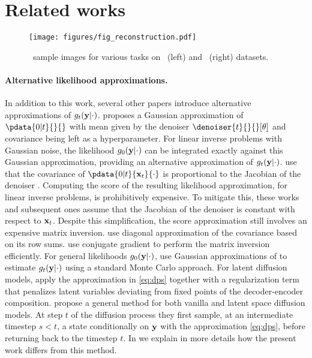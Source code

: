 \section{Related works}
\begin{figure*}[!t]
    \centering 
    \texttt{[image: figures/fig\_reconstruction.pdf]}
    \captionsetup{font=small}
    \caption{\algo\ sample images for various tasks on \imagenet\ (left) and \ffhq\ (right) datasets.}
    \label{fig:main-reconstructions}
\end{figure*}
\paragraph{Alternative likelihood approximations.} In addition to this work, several other papers introduce alternative approximations of $\pot{t}{}$. \cite{song2022pseudoinverse} proposes a Gaussian approximation of $\pdata{0|t}{}{}$ with mean given by the denoiser $\denoiser{t}{}{}[\param]$ and covariance being left as a hyperparameter. For linear inverse problems with Gaussian noise, the likelihood $\pot{0}{}$ can be integrated exactly against this Gaussian approximation, providing an alternative approximation of $\pot{t}{}$. \citet{finzi2023user, stevens2023removing, boys2023tweedie} use that the covariance of $\pdata{0|t}{\bx_t}{\cdot}$ is proportional to the Jacobian of the denoiser \cite{meng2021estimating}. Computing the score of the resulting likelihood approximation, for linear inverse problems, is prohibitively expensive. To mitigate this, these works and subsequent ones assume that the Jacobian of the denoiser is constant with respect to $\mathbf{x}_t$. Despite this simplification, the score approximation still involves an expensive matrix inversion. \citet{boys2023tweedie} use diagonal approximation of the covariance based on its row sums. \citet{rozet2024learning} use conjugate gradient to perform the matrix inversion efficiently. For general likelihoods $\pot{0}{}$, \citet{song2023loss} use Gaussian approximations of \citet{song2022pseudoinverse} to estimate $\pot{t}{}$ using a standard Monte Carlo approach. For latent diffusion models, \citet{rout2024solving} apply the approximation in \eqref{eq:dps} together with a regularization term that penalizes latent variables deviating from fixed points of the decoder-encoder composition. \citet{moufad2024variational} propose a general method for both vanilla and latent space diffusion models. At step $t$ of the diffusion process they first sample, at an intermediate timestep $s < t$, a state conditionally on ${\mathbf{y}}$ with the approximation \eqref{eq:dps}, before returning back to the timestep $t$. In  we explain in more details how the present work differs from this method. 

